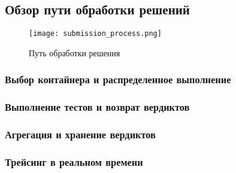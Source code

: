 



\subsection{Обзор пути обработки решений}
\begin{figure}[h]
    \centering
    \texttt{[image: submission\_process.png]}
    \caption{Путь обработки решения}
\end{figure}

\subsubsection{Выбор контайнера и распределенное выполнение}

\subsubsection{Выполнение тестов и возврат вердиктов}

\subsubsection{Агрегация и хранение вердиктов}

\subsubsection{Трейсинг в реальном времени}

